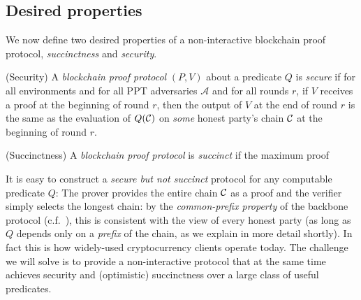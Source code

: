 \subsection{Desired properties}

We now define two desired properties of a non-interactive blockchain proof
protocol, \emph{succinctness} and \emph{security}.

\begin{definition}{(Security)}
A \emph{blockchain proof protocol} $(P, V)$ about a predicate $Q$ is
\emph{secure} if for all environments and for all PPT adversaries
$\mathcal{A}$ and for all rounds $r$, if $V$ receives a proof at the beginning
of round $r$, then the output of $V$ at the end of round $r$ is the same as the
evaluation of $Q(\mathcal{C})$ on \emph{some} honest party's chain $\mathcal{C}$ at the
beginning of round $r$.
\end{definition}

\begin{definition}{(Succinctness)}
A \emph{blockchain proof protocol} is \textit{succinct} if the maximum proof
\end{definition}

It is easy to construct a \emph{secure but not succinct} protocol for any
computable predicate $Q$: The prover provides the entire chain $\mathcal{C}$ as a proof and the
verifier simply selects the longest chain:
by the \emph{common-prefix property} of the backbone protocol (c.f.~\cite{backbone}), this is consistent with
the view of every honest party (as long as $Q$ depends only on a \emph{prefix} of the chain, as we explain in more detail shortly). In fact this is how widely-used cryptocurrency clients operate today.
The challenge we will solve is to provide a non-interactive protocol that at the
same time achieves security and (optimistic) succinctness over a large class of
useful predicates.
